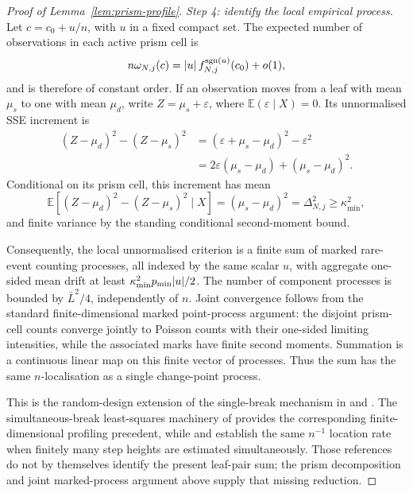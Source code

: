 \documentclass[11pt]{article}
\theoremstyle{plain}
\theoremstyle{definition}
\theoremstyle{remark}
\newcommand{\E}{\mathbb{E}}
\DeclarePairedDelimiter{\abs}{\lvert}{\rvert}
\begin{document}
\begin{proof}[Proof of Lemma~\ref{lem:prism-profile}]
\emph{Step 4: identify the local empirical process.}
Let \(c=c_0+u/n\), with \(u\) in a fixed compact set.  The expected number of
observations in each active prism cell is
\[
  n\omega_{N,j}(c)
  =
  \abs{u}\,
  f_{N,j}^{\operatorname{sgn}(u)}(c_0)+o(1),
\]
and is therefore of constant order.  If an observation moves from a leaf
with mean \(\mu_s\) to one with mean \(\mu_d\), write
\(Z=\mu_s+\varepsilon\), where
\(\E(\varepsilon\mid X)=0\).  Its unnormalised SSE increment is
\begin{align*}
  (Z-\mu_d)^2-(Z-\mu_s)^2
  &=
  (\varepsilon+\mu_s-\mu_d)^2-\varepsilon^2
  \\
  &=
  2\varepsilon(\mu_s-\mu_d)
  +(\mu_s-\mu_d)^2.
\end{align*}
Conditional on its prism cell, this increment has mean
\[
  \E\!\left[
    (Z-\mu_d)^2-(Z-\mu_s)^2
    \mid X
  \right]
  =
  (\mu_s-\mu_d)^2
  =
  \Delta_{N,j}^2
  \ge\kappa_{\min}^2,
\]
and finite variance by the standing conditional second-moment bound.

Consequently, the local unnormalised criterion is a finite sum of marked
rare-event counting processes, all indexed by the same scalar \(u\), with
aggregate one-sided mean drift at least
\(\kappa_{\min}^2p_{\min}\abs u/2\).  The number of component processes is
bounded by \(\bar L^2/4\), independently of \(n\).  Joint convergence follows
from the standard finite-dimensional marked point-process argument: the
disjoint prism-cell counts converge jointly to Poisson counts with their
one-sided limiting intensities, while the associated marks have finite second
moments.  Summation is a continuous linear map on this finite vector of
processes.  Thus the sum has the same \(n\)-localisation as a single
change-point process.

This is the random-design extension of the single-break mechanism in
\citet{chan1993} and \citet{seijosen2011}.  The simultaneous-break
least-squares machinery of \citet{baiperron1998} provides the corresponding
finite-dimensional profiling precedent, while \citet{yaoau1989} and
\citet{boysen2009} establish the same \(n^{-1}\) location rate when finitely
many step heights are estimated simultaneously.  Those references do not by
themselves identify the present leaf-pair sum; the prism decomposition and
joint marked-process argument above supply that missing reduction.


\end{proof}
\end{document}
